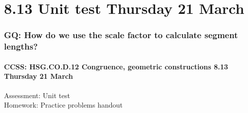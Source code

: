 \documentclass{beamer}
\begin{document}
\section{8.13 Unit test Thursday 21 March}
  \frame
  {
    \frametitle{GQ: How do we use the scale factor to calculate segment lengths?}
    \framesubtitle{CCSS: HSG.CO.D.12 Congruence, geometric constructions \hfill \alert{8.13 Thursday 21 March}}


    Assessment: \alert{Unit test}\\[0.5cm]
    Homework: Practice problems handout
  }
\end{document}
